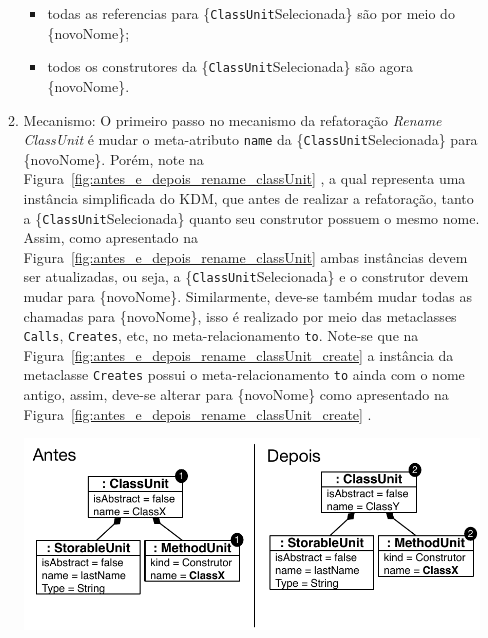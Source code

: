 \begin{enumerate}
\begin{enumerate}
\begin{itemize}
			        \item todas as referencias para \{\texttt{ClassUnit}Selecionada\} são por meio do \{novoNome\};
			        \item todos os construtores da \{\texttt{ClassUnit}Selecionada\} são agora \{novoNome\}.
			    \end{itemize}
			\item Mecanismo: O primeiro passo no mecanismo da refatoração \textit{Rename ClassUnit} é mudar o meta-atributo \texttt{name} da \{\texttt{ClassUnit}Selecionada\} para \{novoNome\}. Porém, note na Figura~\ref{fig:antes_e_depois_rename_classUnit} , a qual representa uma instância simplificada do KDM, que antes de realizar a refatoração, tanto a \{\texttt{ClassUnit}Selecionada\} quanto seu construtor possuem o mesmo nome. Assim, como apresentado na Figura~\ref{fig:antes_e_depois_rename_classUnit}  ambas instâncias devem ser atualizadas, ou seja, a \{\texttt{ClassUnit}Selecionada\} e o construtor devem mudar para \{novoNome\}. Similarmente, deve-se também mudar todas as chamadas para \{novoNome\}, isso é realizado por meio das metaclasses \texttt{Calls}, \texttt{Creates}, etc, no meta-relacionamento \texttt{to}. Note-se que na Figura~\ref{fig:antes_e_depois_rename_classUnit_create}   a instância da metaclasse \texttt{Creates} possui o meta-relacionamento \texttt{to} ainda com o nome antigo, assim, deve-se alterar para \{novoNome\} como apresentado na Figura~\ref{fig:antes_e_depois_rename_classUnit_create} .
			\begin{minipage}{.90\textwidth}
	\vspace*{\fill}
  \centering
	\includegraphics[scale=0.6]{images/antes_e_depois_rename_classUnit.pdf}
	\fautor
	\label{fig:antes_e_depois_rename_classUnit}

\end{minipage}
\end{enumerate}
\end{enumerate}
